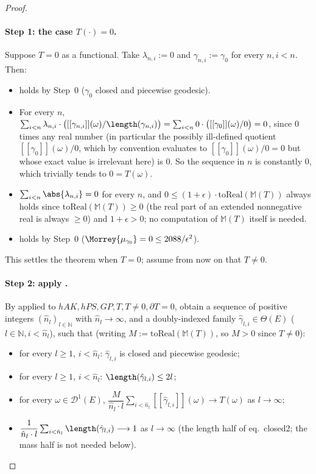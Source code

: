 \begin{proof}
  \paragraph{Step 1: the case $T(\cdot)=0$.} Suppose $T=0$ as a functional. Take
  $\lambda_{n,i}:=0$ and $\gamma_{n,i}:=\gamma_0$ for every $n,i<n$. Then:
  \begin{itemize}
    \item[(a)] holds by Step~0 ($\gamma_0$ closed and piecewise geodesic).
    \item[(b)] For every $n$, $\sum_{i<n}\lambda_{n,i}\cdot\bigl([[\gamma_{n,i}]](\omega)/
      \length(\gamma_{n,i})\bigr) = \sum_{i<n} 0\cdot\bigl([[\gamma_0]](\omega)/0\bigr) = 0$,
      since $0$ times any real number (in particular the possibly ill-defined quotient
      $[[\gamma_0]](\omega)/0$, which by convention evaluates to $[[\gamma_0]](\omega)/0=0$ but
      whose exact value is irrelevant here) is $0$. So the sequence in $n$ is constantly $0$,
      which trivially tends to $0=T(\omega)$.
    \item[(c)] $\sum_{i<n}\abs{\lambda_{n,i}}=0$ for every $n$, and
      $0\le(1+\epsilon)\cdot\mathrm{toReal}(\mathbb M(T))$ always holds since
      $\mathrm{toReal}(\mathbb M(T))\ge0$ (the real part of an extended nonnegative real is always
      $\ge0$) and $1+\epsilon>0$; no computation of $\mathbb M(T)$ itself is needed.
    \item[(d)] holds by Step~0 ($\Morrey{\mu_{\gamma_0}}=0\le2088/\epsilon^2$).
  \end{itemize}
  This settles the theorem when $T=0$; assume from now on that $T\ne0$.

  \paragraph{Step 2: apply .} By  applied to
  $hAK,hPS,GP,T,T\ne0,\partial T=0$, obtain a sequence of positive integers
  $(\hat n_l)_{l\in\mathbb N}$ with $\hat n_l\to\infty$, and a doubly-indexed family
  $\hat\gamma_{l,i}\in\Theta(E)$
  ($l\in\mathbb N,i<\hat n_l$), such that (writing $M:=\mathrm{toReal}(\mathbb M(T))$, so $M>0$
  since $T\ne0$):
  \begin{itemize}
    \item[(BB-a)] for every $l\ge1$, $i<\hat n_l$: $\hat\gamma_{l,i}$ is closed and piecewise
      geodesic;
    \item[(BB-b)] for every $l\ge1$, $i<\hat n_l$: $\length(\hat\gamma_{l,i})\le2l$;
    \item[(BB-c)] for every $\omega\in\mathcal D^1(E)$,
      \(
        \dfrac{M}{\hat n_l\cdot l}\sum_{i<\hat n_l}[[\hat\gamma_{l,i}]](\omega)
        \longrightarrow T(\omega)
      \) as $l\to\infty$;
    \item[(BB-len)] $\dfrac1{\hat n_l\cdot l}\sum_{i<\hat n_l}\length(\hat\gamma_{l,i})
      \longrightarrow1$ as $l\to\infty$ (the length half of eq.~closed2; the mass half is not
      needed below).
  \end{itemize}


\end{proof}
